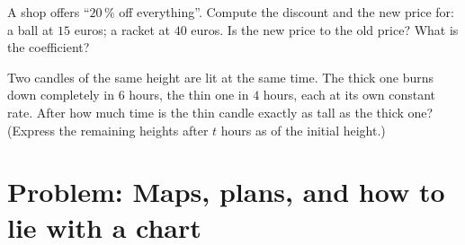 \begin{exercise}[$\star\star$]\label{exo:g6:propdata:11}
A shop offers ``$20\,\%$ off everything''. Compute the discount and
the new price for: a ball at $15$ euros; a racket at $40$ euros. Is the
new price  to the old price? What is the coefficient?
\end{exercise}

\begin{exercise}[$\star\star\star$]\label{exo:g6:propdata:12}
Two candles of the same height are lit at the same time. The thick one
burns down completely in $6$ hours, the thin one in $4$ hours, each at
its own constant rate. After how much time is the thin candle exactly
 as tall as the thick one? (Express the remaining heights after
$t$ hours as  of the initial height.)
\end{exercise}

\section{Problem: Maps, plans, and how to lie with a chart}

